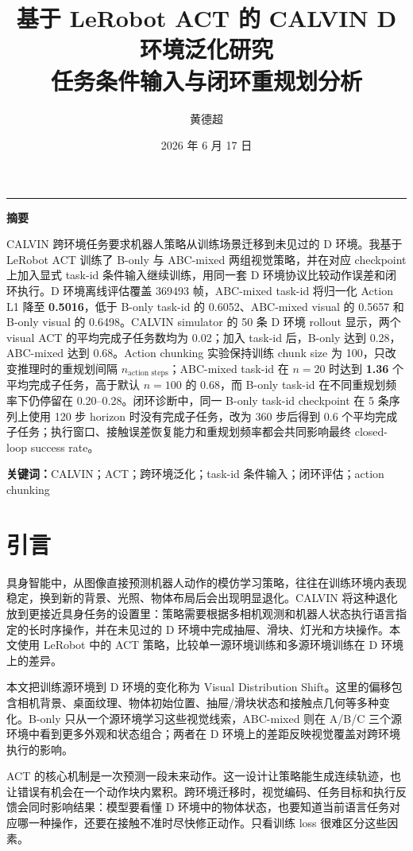 \documentclass[11pt,a4paper,fontset=fandol]{ctexart}
\title{\textbf{基于 LeRobot ACT 的 CALVIN D 环境泛化研究}\\[0.25em]
{\large 任务条件输入与闭环重规划分析}}
\author{黄德超 \quad 23300660009}
\date{2026 年 6 月 17 日}
\makeatletter
\renewcommand{\maketitle}{%
  \begingroup
  \begin{center}
    \vspace*{-1.2em}
    {\LARGE\bfseries\color{ink}\@title\par}
    \vspace{0.65em}
    {\normalsize\@author\par}
    \vspace{0.35em}
    {\normalsize\@date\par}
    \vspace{0.5em}
    {\color{linegray}\rule{0.72\linewidth}{0.6pt}\par}
  \end{center}
  \vspace{0.35em}
  \endgroup
}
\renewenvironment{abstract}{%
  \par\small
  \begin{center}\bfseries 摘要\end{center}
  \vspace{-0.25em}
  \noindent
}{%
  \par\vspace{0.35em}
}
\newcommand{\actionlone}{Action L1}
\newcommand{\best}[1]{\textbf{\textcolor{sourceblue}{#1}}}
\makeatother
\begin{document}
\maketitle

\begin{abstract}
  CALVIN 跨环境任务要求机器人策略从训练场景迁移到未见过的 D 环境。我基于 LeRobot ACT 训练了 B-only 与 ABC-mixed 两组视觉策略，并在对应 checkpoint 上加入显式 task-id 条件输入继续训练，用同一套 D 环境协议比较动作误差和闭环执行。D 环境离线评估覆盖 369493 帧，ABC-mixed task-id 将归一化 \actionlone{} 降至 \best{0.5016}，低于 B-only task-id 的 0.6052、ABC-mixed visual 的 0.5657 和 B-only visual 的 0.6498。CALVIN simulator 的 50 条 D 环境 rollout 显示，两个 visual ACT 的平均完成子任务数均为 0.02；加入 task-id 后，B-only 达到 0.28，ABC-mixed 达到 0.68。Action chunking 实验保持训练 chunk size 为 100，只改变推理时的重规划间隔 $n_\text{action steps}$；ABC-mixed task-id 在 $n=20$ 时达到 \best{1.36} 个平均完成子任务，高于默认 $n=100$ 的 0.68，而 B-only task-id 在不同重规划频率下仍停留在 0.20--0.28。闭环诊断中，同一 B-only task-id checkpoint 在 5 条序列上使用 120 步 horizon 时没有完成子任务，改为 360 步后得到 0.6 个平均完成子任务；执行窗口、接触误差恢复能力和重规划频率都会共同影响最终 closed-loop success rate。
\end{abstract}

\noindent\textbf{关键词：}CALVIN；ACT；跨环境泛化；task-id 条件输入；闭环评估；action chunking

\section{引言}

具身智能中，从图像直接预测机器人动作的模仿学习策略，往往在训练环境内表现稳定，换到新的背景、光照、物体布局后会出现明显退化。CALVIN 将这种退化放到更接近具身任务的设置里：策略需要根据多相机观测和机器人状态执行语言指定的长时序操作，并在未见过的 D 环境中完成抽屉、滑块、灯光和方块操作。本文使用 LeRobot 中的 ACT 策略，比较单一源环境训练和多源环境训练在 D 环境上的差异。

本文把训练源环境到 D 环境的变化称为 Visual Distribution Shift。这里的偏移包含相机背景、桌面纹理、物体初始位置、抽屉/滑块状态和接触点几何等多种变化。B-only 只从一个源环境学习这些视觉线索，ABC-mixed 则在 A/B/C 三个源环境中看到更多外观和状态组合；两者在 D 环境上的差距反映视觉覆盖对跨环境执行的影响。

ACT 的核心机制是一次预测一段未来动作。这一设计让策略能生成连续轨迹，也让错误有机会在一个动作块内累积。跨环境迁移时，视觉编码、任务目标和执行反馈会同时影响结果：模型要看懂 D 环境中的物体状态，也要知道当前语言任务对应哪一种操作，还要在接触不准时尽快修正动作。只看训练 loss 很难区分这些因素。
\end{document}
